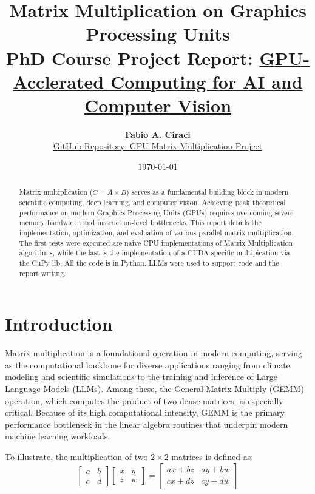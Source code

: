 \documentclass[11pt,a4paper]{article}
\title{\textbf{Matrix Multiplication on Graphics Processing Units}\\
\large PhD Course Project Report: \href{https://fabiotosi92.github.io/phd-course-gpu-2026/}{GPU-Acclerated Computing for AI and Computer Vision}}
\author{\textbf{Fabio A. Ciraci} \\ \small \href{https://github.com/FabioC-alt/GPU-Matrix-Multiplication-Project}{GitHub Repository: GPU-Matrix-Multiplication-Project}}
\date{\today}
\begin{document}
\maketitle

\begin{abstract}

Matrix multiplication ($C = A \times B$) serves as a fundamental building block in modern scientific computing, deep learning, and computer vision. 
Achieving peak theoretical performance on modern Graphics Processing Units (GPUs) requires overcoming severe memory bandwidth and instruction-level bottlenecks. 
This report details the implementation, optimization, and evaluation of various parallel matrix multiplication.
The first tests were executed are naive CPU implementations of Matrix Multiplication algorithms, while the last is the implementation of a CUDA specific multipication via the CuPy lib.
All the code is in Python. LLMs were used to support code and the report writing.




\end{abstract}

\section{Introduction}
\label{sec:intro}

Matrix multiplication is a foundational operation in modern computing, serving as the computational backbone for diverse applications ranging from climate modeling and scientific simulations to the training and inference of Large Language Models (LLMs).
Among these, the General Matrix Multiply (GEMM) operation, which computes the product of two dense matrices, is especially critical. Because of its high computational intensity, GEMM is the primary performance bottleneck in the linear algebra routines that underpin modern machine learning workloads.

To illustrate, the multiplication of two $2 \times 2$ matrices is defined as:
\[
\begin{bmatrix}
a & b \\
c & d
\end{bmatrix}
\begin{bmatrix}
x & y \\
z & w
\end{bmatrix}
=
\begin{bmatrix}
ax + bz & ay + bw \\
cx + dz & cy + dw
\end{bmatrix}
\]
\end{document}
